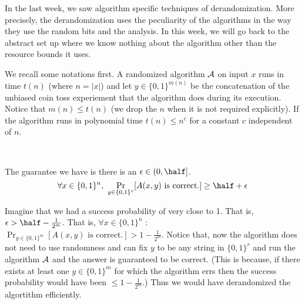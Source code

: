 \noindent 

In the last week, we saw algorithm specific techniques of derandomization. More precisely, the derandomization uses the peculiarity of the algorithms in the way they use the random bits and the analysis. In this week, we will go back to the abstract set up where we know nothing about the algorithm other than the resource bounds it uses.

We recall some notations first. A randomized algorithm ${\cal{A}}$ on input $x$ runs in time $t(n)$ (where $n=|x|$) and let $y \in \{0,1\}^{m(n)}$ be the concatenation of the unbiased coin toss experiement that the algorithm does during its execution. Notice that $m(n) \le t(n)$ (we drop the $n$ when it is not required explicitly). If the algorithm runs in polynomial time $t(n) \le n^c$ for a constant $c$ independent of $n$. \\

\begin{minipage}{0.4\linewidth}
\end{minipage}
\begin{minipage}{0.05\linewidth}
~
\end{minipage}
\begin{minipage}{0.5\linewidth}
\vspace{-7mm}
The guarantee we have is there is an $\epsilon \in (0,\half]$.
\vspace{-3mm}
$$\forall x \in \{0,1\}^n,~\Pr_{y \in \{0,1\}^r} [A(x,y) \textrm{ is correct.}] \ge \half+\epsilon $$
\end{minipage}
\vspace{3mm}

\noindent Imagine that we had a success probability of very close to 1. That is, $\epsilon > \half-\frac{1}{2^{m}}$. That is, $\forall x \in \{0,1\}^n$ : 
$\Pr_{y \in \{0,1\}^m} [A(x,y) \textrm{ is correct.}] > 1-\frac{1}{2^m}$. Notice that, now the algorithm does not need to use randomness and can fix $y$ to be any string in $\{0,1\}^r$ and run the algorithm ${\cal{A}}$ and the answer is guaranteed to be correct. (This is because, if there exists at least one $y \in \{0,1\}^m$ for which the algorithm errs then the success probability would have been $\le 1-\frac{1}{2^m}$.) Thus we would have derandomized the algortithm efficiently.

